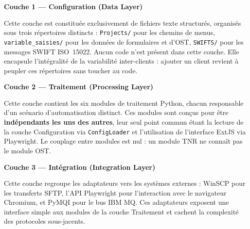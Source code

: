 \documentclass[12pt, a4paper]{report}
\begin{document}
\medskip

\noindent\textbf{Couche 1 — Configuration (Data Layer)}

\noindent Cette couche est constituée exclusivement de fichiers texte structurés, organisés sous trois répertoires distincts : \texttt{Projects/} pour les chemins de menus, \texttt{variable\_saisies/} pour les données de formulaires et d'OST, \texttt{SWIFTS/} pour les messages SWIFT ISO~15022. Aucun code n'est présent dans cette couche. Elle encapsule l'intégralité de la variabilité inter-clients : ajouter un client revient à peupler ces répertoires sans toucher au code.

\medskip

\noindent\textbf{Couche 2 — Traitement (Processing Layer)}

\noindent Cette couche contient les six modules de traitement Python, chacun responsable d'un scénario d'automatisation distinct. Ces modules sont conçus pour être \textbf{indépendants les uns des autres}, leur seul point commun étant la lecture de la couche Configuration via \texttt{ConfigLoader} et l'utilisation de l'interface ExtJS via Playwright. Le couplage entre modules est nul : un module TNR ne connaît pas le module OST.

\medskip

\noindent\textbf{Couche 3 — Intégration (Integration Layer)}

\noindent Cette couche regroupe les adaptateurs vers les systèmes externes : WinSCP pour les transferts SFTP, l'API Playwright pour l'interaction avec le navigateur Chromium, et PyMQI pour le bus IBM MQ. Ces adaptateurs exposent une interface simple aux modules de la couche Traitement et cachent la complexité des protocoles sous-jacents.

\medskip
\end{document}
